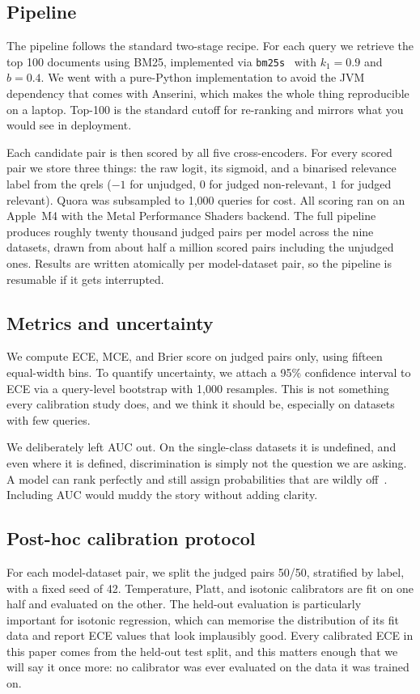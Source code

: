 \subsection{Pipeline}
\label{sec:pipeline}
The pipeline follows the standard two-stage recipe. For each query we retrieve the
top 100 documents using BM25, implemented via \texttt{bm25s}~\cite{bm25s2024} with
$k_1=0.9$ and $b=0.4$. We went with a pure-Python implementation to avoid the JVM
dependency that comes with Anserini, which makes the whole thing reproducible on a
laptop. Top-100 is the standard cutoff for re-ranking and mirrors what you would see
in deployment.

Each candidate pair is then scored by all five cross-encoders. For every scored pair
we store three things: the raw logit, its sigmoid, and a binarised relevance label
from the qrels ($-1$ for unjudged, $0$ for judged non-relevant, $1$ for judged
relevant). Quora was subsampled to 1{,}000 queries for cost. All scoring ran on an
Apple~M4 with the Metal Performance Shaders backend. The full pipeline produces
roughly twenty thousand judged pairs per model across the nine datasets, drawn from
about half a million scored pairs including the unjudged ones. Results are written
atomically per model-dataset pair, so the pipeline is resumable if it gets
interrupted.

\subsection{Metrics and uncertainty}
\label{sec:metrics}
We compute ECE, MCE, and Brier score on judged pairs only, using fifteen equal-width
bins. To quantify uncertainty, we attach a 95\% confidence interval to ECE via a
query-level bootstrap with 1{,}000 resamples. This is not something every
calibration study does, and we think it should be, especially on datasets with few
queries.

We deliberately left AUC out. On the single-class datasets it is undefined, and even
where it is defined, discrimination is simply not the question we are asking. A model
can rank perfectly and still assign probabilities that are wildly
off~\cite{degroot1983}. Including AUC would muddy the story without adding clarity.

\subsection{Post-hoc calibration protocol}
\label{sec:protocol}
For each model-dataset pair, we split the judged pairs 50/50, stratified by label,
with a fixed seed of 42. Temperature, Platt, and isotonic calibrators are fit on one
half and evaluated on the other. The held-out evaluation is particularly important
for isotonic regression, which can memorise the distribution of its fit data and
report ECE values that look implausibly good. Every calibrated ECE in this paper
comes from the held-out test split, and this matters enough that we will say it once
more: no calibrator was ever evaluated on the data it was trained on.

